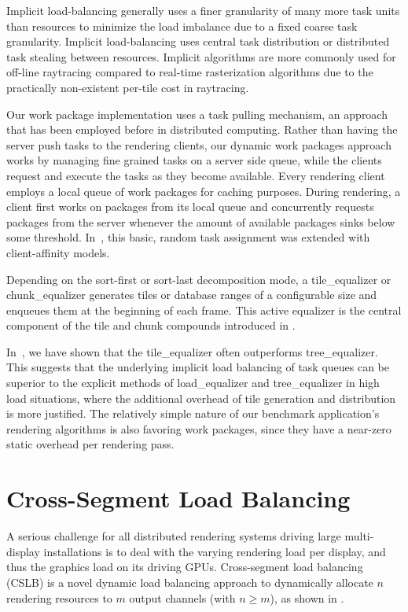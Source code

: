 Implicit load-balancing generally uses a finer granularity of many more task
units than resources to minimize the load imbalance due to a fixed coarse task
granularity. Implicit load-balancing uses central task distribution or
distributed task stealing between resources. Implicit algorithms are more
commonly used for off-line raytracing compared to real-time rasterization
algorithms due to the practically non-existent per-tile cost in raytracing.

Our work package implementation uses a task pulling mechanism, an approach that
has been employed before in distributed computing. Rather than having the server
push tasks to the rendering clients, our dynamic work packages approach works by
managing fine grained tasks on a server side queue, while the clients request
and execute the tasks as they become available. Every rendering client employs a
local queue of work packages for caching purposes. During rendering, a client
first works on packages from its local queue and concurrently requests packages
from the server whenever the amount of available packages sinks below some
threshold. In~\cite{SPEP:16}, this basic, random task
assignment was extended with client-affinity models.

Depending on the sort-first or sort-last decomposition mode, a
\textsf{tile\_equalizer} or \textsf{chunk\_equalizer} generates tiles or
database ranges of a configurable size and enqueues them at the beginning of
each frame. This active equalizer is the central component of the tile and chunk
compounds introduced in .

In~\cite{SPEP:16}, we have shown that the \textsf{tile\_equalizer} often
outperforms \textsf{tree\_equalizer}. This suggests that the underlying implicit
load balancing of task queues can be superior to the explicit methods of
\textsf{load\_equalizer} and \textsf{tree\_equalizer} in high load situations,
where the additional overhead of tile generation and distribution is more
justified. The relatively simple nature of our benchmark application's rendering
algorithms is also favoring work packages, since they have a near-zero static
overhead per rendering pass.


\section{Cross-Segment Load Balancing}

A serious challenge for all distributed rendering systems driving large
multi-display installations is to deal with the varying rendering load per
display, and thus the graphics load on its driving GPUs. Cross-segment load
balancing (CSLB) is a novel dynamic load balancing approach to dynamically
allocate $n$ rendering resources to $m$ output channels (with $n\geq m$), as
shown in .

